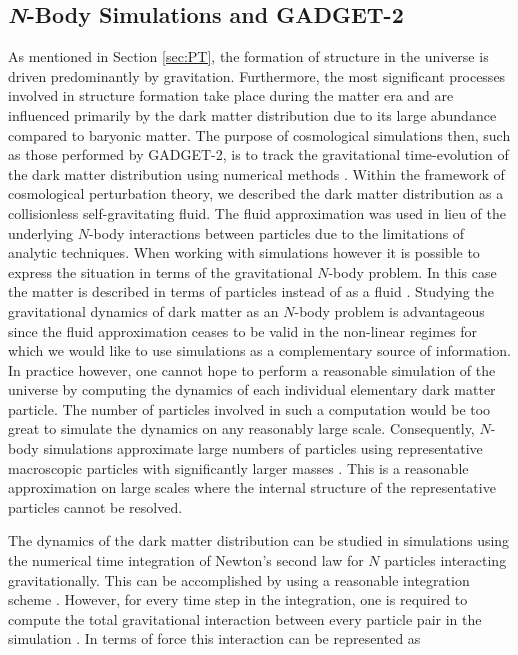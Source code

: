 \documentclass[10pt,letterpaper,final]{iopart}
\numberwithin{equation}{subsection}
\begin{document}
%

\subsection{\emph{N}-Body Simulations and GADGET-2}\label{sec:Nbody}


As mentioned in Section \ref{sec:PT}, the formation of structure in the universe is driven predominantly by gravitation.  Furthermore, the most significant processes involved in structure formation take place during the matter era and are influenced primarily by the dark matter distribution due to its large abundance compared to baryonic matter. The purpose of cosmological simulations then, such as those performed by GADGET-2, is to track the gravitational time-evolution of  the dark matter distribution using numerical methods \cite{Schneider}. Within the framework of cosmological perturbation theory, we described the dark matter distribution as a collisionless self-gravitating fluid. The fluid approximation was used in lieu of the underlying $N$-body interactions between particles due to the limitations of analytic techniques. When working with simulations however it is possible to express the situation in terms of the gravitational $N$-body problem. In this case the matter is described in terms of particles instead of as a fluid \cite{Gadget1}. Studying the gravitational dynamics of dark matter as an $N$-body problem is advantageous since the fluid approximation ceases to be valid in the non-linear regimes for which we would like to use simulations as a complementary source of information. In practice however, one cannot hope to perform a reasonable simulation of the universe by computing the dynamics of each individual elementary dark matter particle. The number of particles involved in such a computation would be too great to simulate the dynamics on any reasonably large scale. Consequently, $N$-body simulations approximate large numbers of particles using representative macroscopic particles with significantly larger masses \cite{Schneider}\cite{Gadget1}\cite{Gadget2}. This is a reasonable approximation on large scales where the internal structure of the representative particles cannot be resolved. 

The dynamics of the dark matter distribution can be studied in simulations using the numerical time integration of Newton's second law for $N$ particles interacting gravitationally. This can be accomplished by using a reasonable integration scheme \cite{Gadget1}\cite{Gadget2}. However, for every time step in the integration, one is required to compute the total gravitational interaction between every particle pair in the simulation \cite{Schneider}. In terms of force this interaction can be represented as
\end{document}
